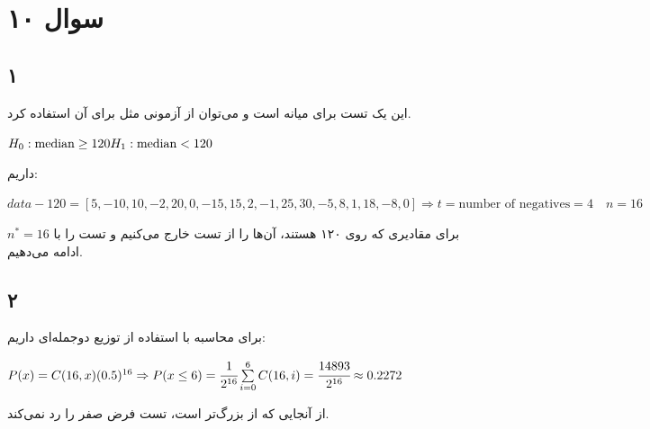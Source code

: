 \documentclass[12pt]{article}
\begin{document}
		\section{سوال ۱۰}
		\subsection{۱}
		این یک تست 
		برای میانه است و می‌توان از آزمونی مثل 
		برای آن استفاده کرد.
		\begin{latin}
			$
			H_0: \text{median} \geq 120
			\\
			H_1: \text{median} < 120
			$
		\end{latin}
	داریم:
	\begin{latin}
		$
		data - 120 = [5, -10, 10, -2, 20, 0, -15, 15, 2, -1, 25, 30, -5, 8, 1, 18, -8, 0] 
		\Rightarrow t = \text{number of negatives}  = 4 \quad n = 16
		$
	\end{latin}
	برای مقادیری که روی ۱۲۰ هستند،‌ آن‌ها را از تست خارج می‌کنیم و تست را با 
	$n^*=16$
	ادامه می‌دهیم.
	\subsection{۲}
	برای محاسبه 
	با استفاده از توزیع دوجمله‌ای داریم:
	\begin{latin}
		$
		P(x) = C(16, x)(0.5)^{16}
		\Rightarrow
		P(x \leq 6) = 
		\cfrac{1}{2^{16}} \sum\limits_{i = 0}^6 C(16, i) 
		= \cfrac{14893}{2^{16}} \approx 0.2272
		$
	\end{latin}
	از آنجایی که 
	از 
	بزرگ‌تر است، تست فرض صفر را رد نمی‌کند.
\end{document}
